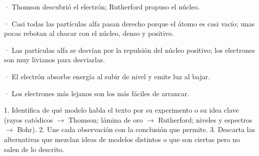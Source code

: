 \begin{clave}[{Recuerda}] · Thomson descubrió el electrón; Rutherford propuso el núcleo.\par · Casi todas las partículas alfa pasan derecho porque el átomo es casi vacío; unas pocas rebotan al chocar con el núcleo, denso y positivo.\par · Las partículas alfa se desvían por la repulsión del núcleo positivo; los electrones son muy livianos para desviarlas.\par · El electrón absorbe energía al subir de nivel y emite luz al bajar.\par · Los electrones más lejanos son los más fáciles de arrancar.\end{clave}
 
\begin{clave} 1. Identifica de qué modelo habla el texto por su experimento o su idea clave (rayos catódicos \ensuremath{\rightarrow} Thomson; lámina de oro \ensuremath{\rightarrow} Rutherford; niveles y espectros \ensuremath{\rightarrow} Bohr). 2. Une cada observación con la conclusión que permite. 3. Descarta las alternativas que mezclan ideas de modelos distintos o que son ciertas pero no salen de lo descrito.\end{clave}
